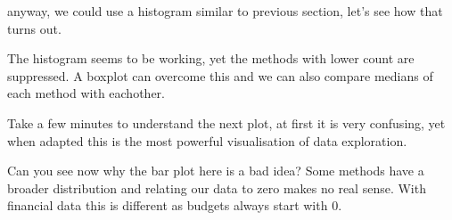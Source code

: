 \documentclass[letterpaper,10pt,english]{jupyterBook}
\begin{document}
\sphinxAtStartPar
anyway, we could use a histogram similar to previous section, let’s see how that turns out.

\begin{sphinxVerbatim}[commandchars=\\\{\}]
      
\end{sphinxVerbatim}

\noindent{}

\sphinxAtStartPar
The histogram seems to be working, yet the methods with lower count are suppressed.
A boxplot can overcome this and we can also compare medians of each method with eachother.

\sphinxAtStartPar
Take a few minutes to understand the next plot, at first it is very confusing, yet when adapted this is the most powerful visualisation of data exploration.

\begin{sphinxVerbatim}[commandchars=\\\{\}]
    
\end{sphinxVerbatim}

\begin{sphinxVerbatim}[commandchars=\\\{\}]
[None]
\end{sphinxVerbatim}

\noindent{}

\sphinxAtStartPar
Can you see now why the bar plot here is a bad idea?
Some methods have a broader distribution and relating our data to zero makes no real sense.
With financial data this is different as budgets always start with 0.
\end{document}
